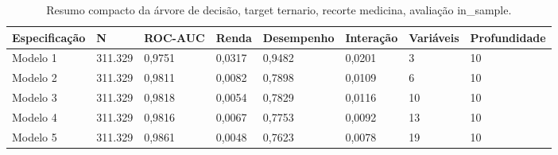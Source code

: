 \begin{table}
\caption{Resumo compacto da árvore de decisão, target ternario, recorte medicina, avaliação in_sample.}
\label{tab:tabela_compacta_treeClassification_10_profundidade_ternario_recorte_medicina_in_sample}
\begin{tabular}{llllllll}
\toprule
Especificação & N & ROC-AUC & Renda & Desempenho & Interação & Variáveis & Profundidade \\
\midrule
Modelo 1 & 311.329 & 0,9751 & 0,0317 & 0,9482 & 0,0201 & 3 & 10 \\
Modelo 2 & 311.329 & 0,9811 & 0,0082 & 0,7898 & 0,0109 & 6 & 10 \\
Modelo 3 & 311.329 & 0,9818 & 0,0054 & 0,7829 & 0,0116 & 10 & 10 \\
Modelo 4 & 311.329 & 0,9816 & 0,0067 & 0,7753 & 0,0092 & 13 & 10 \\
Modelo 5 & 311.329 & 0,9861 & 0,0048 & 0,7623 & 0,0078 & 19 & 10 \\
\bottomrule
\end{tabular}
\end{table}
